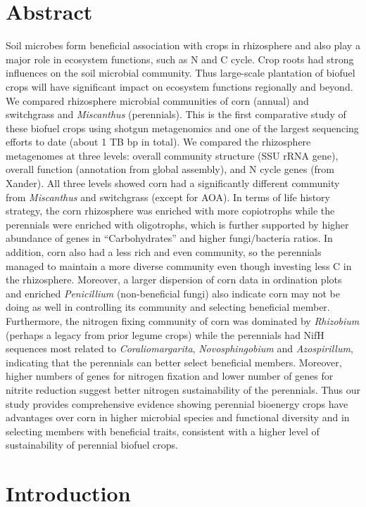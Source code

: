 \documentclass[]{msu-thesis}
\begin{document}
\section{Abstract}
Soil microbes form beneficial association with crops in rhizosphere and
also play a major role in ecosystem functions, such as N and C cycle.
Crop roots had strong influences on the soil microbial community. Thus
large-scale plantation of biofuel crops will have significant impact on
ecosystem functions regionally and beyond. We compared rhizosphere
microbial communities of corn (annual) and switchgrass and
\textit{Miscanthus} (perennials). This is the first comparative study of
these biofuel crops using shotgun metagenomics and one of the largest
sequencing efforts to date (about 1 TB bp in total). We compared the
rhizosphere metagenomes at three levels: overall community structure
(SSU rRNA gene), overall function (annotation from global assembly), and
N cycle genes (from Xander). All three levels showed corn had a
significantly different community from \textit{Miscanthus} and
switchgrass (except for AOA). In terms of life history strategy, the
corn rhizosphere was enriched with more copiotrophs while the perennials
were enriched with oligotrophs, which is further supported by higher
abundance of genes in “Carbohydrates” and higher fungi/bacteria ratios.
In addition, corn also had a less rich and even community, so the
perennials managed to maintain a more diverse community even though
investing less C in the rhizosphere. Moreover, a larger dispersion of
corn data in ordination plots and enriched \textit{Penicillium} (non-beneficial
fungi) also indicate corn may not be doing as well in controlling its
community and selecting beneficial member. Furthermore, the nitrogen
fixing community of corn was dominated by \textit{Rhizobium} (perhaps a
legacy from prior legume crops) while the perennials had NifH sequences
most related to \textit{Coraliomargarita}, \textit{Novosphingobium} and
\textit{Azospirillum}, indicating that the perennials can better select
beneficial members. Moreover, higher numbers of genes for nitrogen
fixation and lower number of genes for nitrite reduction suggest better
nitrogen sustainability of the perennials. Thus our study provides
comprehensive evidence showing perennial bioenergy crops have advantages
over corn in higher microbial species and functional diversity and in
selecting members with beneficial traits, consistent with a higher level
of sustainability of perennial biofuel crops.

\section{Introduction}
\end{document}

